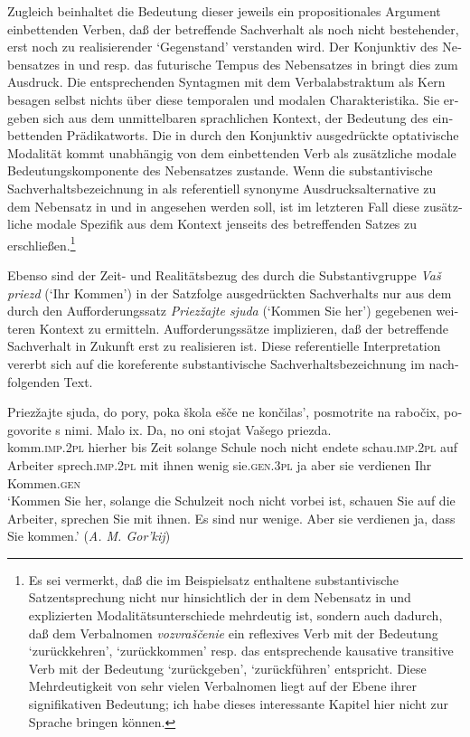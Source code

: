 \documentclass[output=paper]{langscibook}
\begin{document}
\begin{otherlanguage}{german}
\largerpage[-1]
\noindent Zugleich beinhaltet die Bedeutung dieser jeweils ein propositionales Argument einbettenden Verben, daß der betreffende Sachverhalt als noch nicht bestehender, erst noch zu realisierender ‘Gegenstand’ verstanden wird. Der Konjunktiv des Nebensatzes in  und  resp. das futurische Tempus des Nebensatzes in  bringt dies zum Ausdruck. Die entsprechenden Syntagmen mit dem Verbalabstraktum als Kern besagen selbst nichts über diese temporalen und modalen Charakteristika. Sie ergeben sich aus dem unmittelbaren sprachlichen Kontext, der Bedeutung des einbettenden Prädikatworts. Die in  durch den Konjunktiv ausgedrückte optativische Modalität kommt unabhängig von dem einbettenden Verb als zusätzliche modale Bedeutungskomponente des Nebensatzes zustande. Wenn die substantivische Sachverhaltsbezeichnung in  als referentiell synonyme Ausdrucksalternative zu dem Nebensatz in  und in  angesehen werden soll, ist im letzteren Fall diese zusätzliche modale Spezifik aus dem Kontext jenseits des betreffenden Satzes zu erschließen.\footnote{Es sei vermerkt, daß die im Beispielsatz  enthaltene substantivische Satzentsprechung nicht nur hinsichtlich der in dem Nebensatz in  und  explizierten Modalitätsunterschiede mehrdeutig ist, sondern auch dadurch, daß dem Verbalnomen \textit{vozvraščenie} ein reflexives Verb mit der Bedeutung ‘zurückkehren’, ‘zurückkommen’ resp. das entsprechende kausative transitive Verb mit der Bedeutung ‘zurückgeben’, ‘zurückführen’ entspricht. Diese Mehrdeutigkeit von sehr vielen Verbalnomen liegt auf der Ebene ihrer signifikativen Bedeutung; ich habe dieses interessante Kapitel hier nicht zur
Sprache bringen können.}

Ebenso sind der Zeit- und Realitätsbezug des durch die Substantivgruppe \textit{Vaš priezd} (‘Ihr Kommen’) in der Satzfolge  ausgedrückten Sachverhalts nur aus dem durch den Aufforderungssatz \textit{Priezžajte sjuda} (‘Kommen Sie her’) gegebenen weiteren Kontext zu ermitteln. Aufforderungssätze implizieren, daß der betreffende Sachverhalt in Zukunft erst zu realisieren ist. Diese referentielle Interpretation vererbt sich auf die ko\-re\-fe\-ren\-te substantivische Sachverhaltsbezeichnung im nachfolgenden Text.

\ea \label{ex:zi83:23}
    \gll Priezžajte sjuda, do pory, poka škola ešče ne končilas’, posmotrite na rabočix, pogovorite s nimi.  Malo  ix. Da, no oni stojat Vašego priezda.  \\
    komm.\textsc{imp}.2\textsc{pl}  hierher bis  Zeit solange Schule noch nicht endete schau.\textsc{imp}.2\textsc{pl} auf  Arbeiter sprech.\textsc{imp}.2\textsc{pl}  mit ihnen wenig sie.\textsc{gen}.3\textsc{pl}  ja aber sie verdienen Ihr Kommen.\textsc{gen} \\
    \glt ‘Kommen Sie her, solange die Schulzeit noch nicht vorbei ist, schauen Sie auf die Arbeiter, sprechen Sie mit ihnen. Es sind nur wenige. Aber sie verdienen ja, dass Sie kommen.’ (\textit{A. M. Gor’kij})
\z


\end{otherlanguage}
\end{document}
